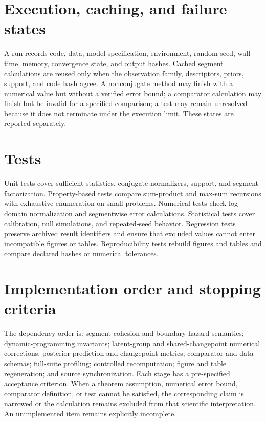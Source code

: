 \section{Execution, caching, and failure states}
A run records code, data, model specification, environment, random seed, wall time, memory,
convergence state, and output hashes. Cached segment calculations are reused only when the
observation family, descriptors, priors, support, and code hash agree. A nonconjugate method may
finish with a numerical value but without a verified error bound; a comparator calculation may
finish but be invalid for a specified comparison; a test may remain unresolved because it does not
terminate under the execution limit. These states are reported separately.

\section{Tests}
Unit tests cover sufficient statistics, conjugate normalizers, support, and segment factorization.
Property-based tests compare sum-product and max-sum recursions with exhaustive enumeration on
small problems. Numerical tests check log-domain normalization and segmentwise error calculations.
Statistical tests cover calibration, null simulations, and repeated-seed behavior. Regression tests
preserve archived result identifiers and ensure that excluded values cannot enter incompatible
figures or tables. Reproducibility tests rebuild figures and tables and compare declared hashes or
numerical tolerances.

\section{Implementation order and stopping criteria}
The dependency order is: segment-cohesion and boundary-hazard semantics; dynamic-programming
invariants; latent-group and shared-changepoint numerical corrections; posterior prediction and
changepoint metrics; comparator and data schemas; full-suite profiling; controlled recomputation;
figure and table regeneration; and source synchronization. Each stage has a pre-specified
acceptance criterion. When a theorem assumption, numerical error bound, comparator definition, or
test cannot be satisfied, the corresponding claim is narrowed or the calculation remains excluded
from that scientific interpretation. An unimplemented item remains explicitly incomplete.
